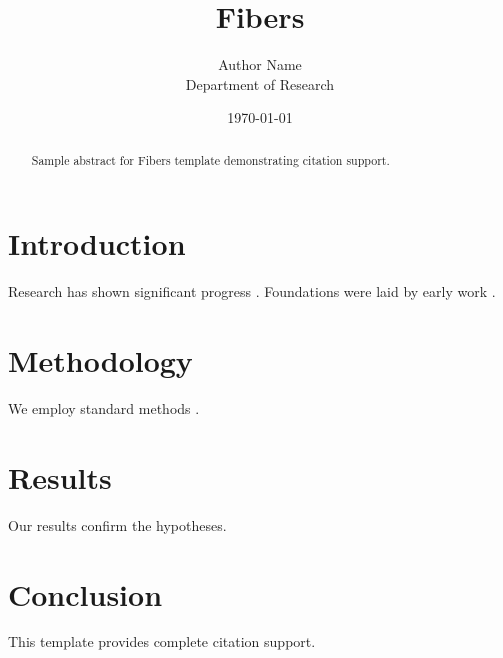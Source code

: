 \documentclass{mdpi}
\title{Fibers}
\author{Author Name \\ \small Department of Research}
\date{\today}
\begin{document}
\maketitle

\begin{abstract}
Sample abstract for Fibers template demonstrating citation support.
\end{abstract}

\section{Introduction}
Research has shown significant progress \citep{einstein1905}. Foundations were laid by early work \citep{turing1950}.

\section{Methodology}
We employ standard methods \citep{knuth1984}.

\section{Results}
Our results confirm the hypotheses.

\section{Conclusion}
This template provides complete citation support.



\end{document}
